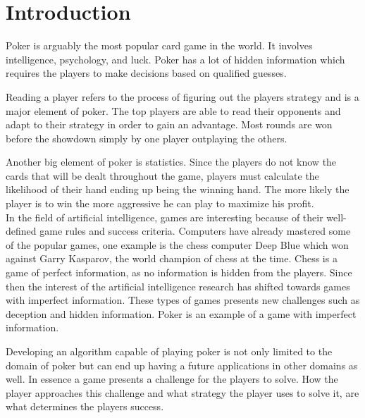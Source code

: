 \section*{Introduction}
Poker is arguably the most popular card game in the world. It involves intelligence, psychology, and luck. Poker has a lot of hidden information which requires the players to make decisions based on qualified guesses.  

Reading a player refers to the process of figuring out the players strategy and is a major element of poker. The top players are able to read their opponents and adapt to their strategy in order to gain an advantage. Most rounds are won before the showdown simply by one player outplaying the others. 

Another big element of poker is statistics. Since the players do not know the cards that will be dealt throughout the game, players must calculate the likelihood of their hand ending up being the winning hand. The more likely the player is to win the more aggressive he can play to maximize his profit.\\


In the field of artificial intelligence, games are interesting because of their well-defined game rules and success criteria.
Computers have already mastered some of the popular games, one example is the chess computer Deep Blue which won against Garry Kasparov, the world champion of chess at the time.
Chess is a game of perfect information, as no information is hidden from the players.
Since then the interest of the artificial intelligence research has shifted towards games with imperfect information. These types of games presents new challenges such as deception and hidden information. Poker is an example of a game with imperfect information.


Developing an algorithm capable of playing poker is not only limited to the domain of poker but can end up having a future applications in other domains as well. In essence a game presents a challenge for the players to solve. How the player approaches this challenge and what strategy the player uses to solve it, are what determines the players success. \\

\newcommand{\chapquote}[3]{\begin{quotation} \textit{#1} \end{quotation} \begin{flushright} - #2, \textit{#3}\end{flushright} }

